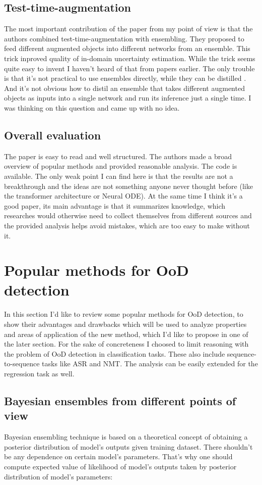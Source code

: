 \documentclass{article}
\begin{document}
\subsection{Test-time-augmentation}
    The most important contribution of the paper from my point of view is that the authors combined test-time-augmentation with ensembling. They proposed to feed different augmented objects into different networks from an ensemble. This trick inproved quality of in-domain uncertainty estimation. While the trick seems quite easy to invent I haven't heard of that from papers earlier. The only trouble is that it's not practical to use ensembles directly, while they can be distilled \cite{end2}. And it's not obvious how to distil an ensemble that takes different augmented objects as inputs into a single network and run its inference just a single time. I was thinking on this question and came up with no idea.

\subsection{Overall evaluation}
    The paper is easy to read and well structured. The authors made a broad overview of popular methods and provided reasonable analysis. The code is available. The only weak point I can find here is that the results are not a breakthrough and the ideas are not something anyone never thought before (like the transformer architecture \cite{transformer} or Neural ODE). At the same time I think it's a good paper, its main advantage is that it summarizes knowledge, which researches would otherwise need to collect themselves from different sources and the provided analysis helps avoid mistakes, which are too easy to make without it.

\section{Popular methods for OoD detection}
    In this section I'd like to review some popular methods for OoD detection, to show their advantages and drawbacks which will be used to analyze properties and areas of application of the new method, which I'd like to propose in one of the later section. For the sake of concreteness I choosed to limit reasoning with the problem of OoD detection in classification tasks. These also include sequence-to-sequence tasks like ASR and NMT. The analysis can be easily extended for the regression task as well.

\subsection{Bayesian ensembles from different points of view}
    Bayesian ensembling technique is based on a theoretical concept of obtaining a posterior distribution of model's outputs given training dataset. There shouldn't be any dependence on certain model's parameters. That's why one should compute expected value of likelihood of model's outputs taken by posterior distribution of model's parameters:
\end{document}
